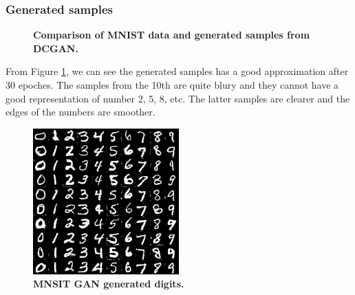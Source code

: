 \documentclass{article}
\newcommand{\mycaption}[2]{\caption[#1]{\textbf{#1.} #2}}
\begin{document}
\newpage
\subsubsection{Generated samples}

\begin{figure}[!htb]
  \centering
  \mycaption{Comparison of MNIST data and generated samples from DCGAN}{}
  \label{fig_DCGAN_MNIST}
\end{figure}

From Figure \ref{fig_DCGAN_MNIST}, 
we can see the generated samples has a good approximation after 30 epoches.
The samples from the 10th are quite blury and they cannot have a good representation of number 2, 5, 8, etc.
The latter samples are clearer and the edges of the numbers are smoother.

\begin{figure}[!htb]
  \centering
  \includegraphics[width=0.5\textwidth]{imgs/MNIST_digits.png}
  \mycaption{MNSIT GAN generated digits}{}
  \label{fig_MNSIT_digits}
\end{figure}
\end{document}
